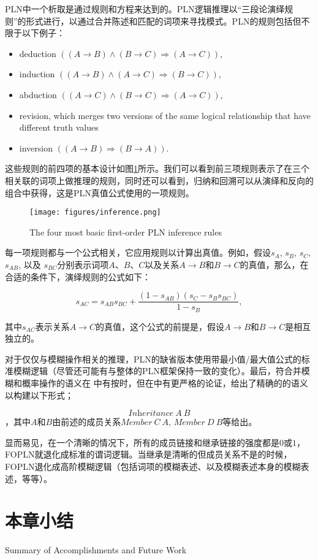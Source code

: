 PLN中一个析取是通过规则和方程来达到的。PLN逻辑推理以“三段论演绎规则”的形式进行，以通过合并陈述和匹配的词项来寻找模式。PLN的规则包括但不限于以下例子：

\begin{itemize}
\item deduction $\left((A\rightarrow B) \wedge (B\rightarrow C) \Rightarrow (A\rightarrow C)\right)$,
\item induction $\left((A\rightarrow B) \wedge (A\rightarrow C) \Rightarrow
(B\rightarrow C)\right)$,
\item abduction $\left((A\rightarrow C) \wedge (B\rightarrow C) \Rightarrow
(A\rightarrow C)\right)$,
  \item revision, which merges two versions of the same logical relationship that have different truth values
\item inversion $\left((A\rightarrow B) \Rightarrow
  (B\rightarrow A)\right)$.
\end{itemize}

这些规则的前四项的基本设计如图\ref{fig:inference}所示。我们可以看到前三项规则表示了在三个相关联的词项上做推理的规则，同时还可以看到，归纳和回溯可以从演绎和反向的组合中获得，这是PLN真值公式使用的一项规则。

\begin{figure}[htb]
  \center
  \texttt{[image: figures/inference.png]}
  \caption{The four most basic first-order PLN inference rules}
  \label{fig:inference}
\end{figure}

每一项规则都与一个公式相关，它应用规则以计算出真值。例如，假设$s_A$, $s_B$, $s_C$, $s_{AB}$, 以及 $s_{BC}$分别表示词项$A$、$B$、$C$以及关系$A\rightarrow B$和$B\rightarrow C$的真值，那么，在合适的条件下，演绎规则的公式如下：

$$s_{AC}=s_{AB}s_{BC}+\frac{\left(1-s_{AB}\right)\left(s_C-s_Bs_{BC}\right)}{1-s_B},$$

其中$s_{AC}$表示关系$A\rightarrow C$的真值，这个公式的前提是，假设$A\rightarrow B$和$B\rightarrow C$是相互独立的。

对于仅仅与模糊操作相关的推理，PLN的缺省版本使用带最小值/最大值公式的标准模糊逻辑（尽管还可能有与整体的PLN框架保持一致的变化）。最后，符合并模糊和概率操作的语义在\cite{Goertzel2008} 中有按时，但在\cite{Goertzel2010e}中有更严格的论证，给出了精确的的语义以构建以下形式；

$$
\textit{Inheritance} \ A \  B
$$，其中$A$和$B$由前述的成员关系$\textit{Member}\ C\ A$, $\textit{Member}\ D\ B$等给出。

显而易见，在一个清晰的情况下，所有的成员链接和继承链接的强度都是$0$或$1$，FOPLN就退化成标准的谓词逻辑。当继承是清晰的但成员关系不是的时候，FOPLN退化成高阶模糊逻辑（包括词项的模糊表述、以及模糊表述本身的模糊表述，等等）。




\section{本章小结}{Summary of Accomplishments and Future Work}
